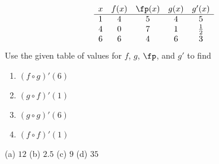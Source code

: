 {\[
\begin{array}{ccccc}
x & f(x) & \fp(x) & g(x) & g'(x) \\\hline
1&4&5&4&5\\
4&0&7&1&\frac12\\
6&6&4&6&3
\end{array}
\]
Use the given table of values for $f$, $g$, $\fp$, and $g'$ to find
\begin{enumerate}
\item $(f \circ g)'(6)$
\item $(g \circ f)'(1)$
\item $(g \circ g)'(6)$
\item $(f \circ f)'(1)$
\end{enumerate}}
{(a) $12$  \quad (b) $2.5$ \quad (c) $9$ \quad (d) $35$
}
